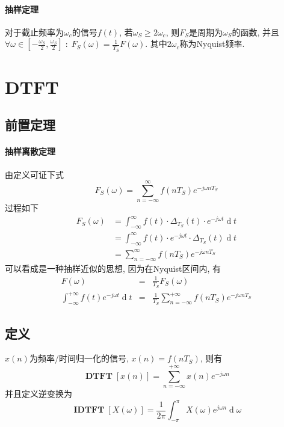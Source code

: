 \documentclass{ctexart}
\DeclareMathOperator{\DTFT}{\mathbf{DTFT}}
\DeclareMathOperator{\IDTFT}{\mathbf{IDTFT}}
\DeclareMathOperator{\ud}{\mathrm{d}}
\begin{document}
\paragraph{抽样定理} 对于截止频率为$\omega_c$的信号$f(t)$, 若$\omega_S \ge 2 \omega_c$, 则$F_S$是周期为$\omega_S$的函数,
    并且$\forall \omega \in [-\frac{\omega_S}{2}, \frac{\omega_S}{2}]\;:\;F_S(\omega) = \frac{1}{T_S} F(\omega)$. 其中$2\omega_c$称为Nyquist频率.


\section{DTFT}
\subsection{前置定理}
\paragraph{抽样离散定理} 由定义可证下式
    \[F_S(\omega) = \sum_{n=-\infty}^{\infty} f(nT_S) e^{- j \omega n T_S}\]过程如下
    \begin{align*}
        F_S(\omega) &= \int_{-\infty}^{\infty} f(t) \cdot \Delta_{T_S}(t) \cdot e^{-j \omega t} \ud t\\
            &= \int_{-\infty}^{\infty} f(t) \cdot e^{-j \omega t} \cdot \Delta_{T_S}(t) \ud t\\
            &= \sum_{n=-\infty}^{\infty} f(nT_S) e^{-j \omega nT_S}
    \end{align*}
    可以看成是一种抽样近似的思想, 因为在Nyquist区间内, 有\begin{eqnarray*}
        F(\omega) &=& \frac{1}{T_S} F_S(\omega)\\
        \int_{-\infty}^{+\infty} f(t) e^{-j \omega t} \ud t &=& \frac{1}{T_S} \sum_{n = -\infty}^{+\infty} f(nT_S) e^{-j \omega nT_S}
    \end{eqnarray*}

\subsection{定义} $x(n)$为频率/时间归一化的信号, $x(n) = f(nT_S)$, 则有\[
    \DTFT[x(n)] = \sum_{n = -\infty}^{+\infty} x(n) e^{-j \omega n} \]
    并且定义逆变换为 \[
    \IDTFT[X(\omega)] = \frac{1}{2\pi} \int_{-\pi}^{\pi} X(\omega) e^{j \omega n} \ud \omega\]
\end{document}
